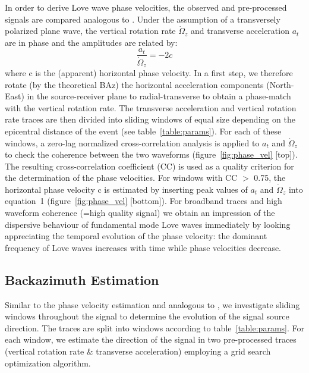 \documentclass[12pt,reqno,letter]{article}
\begin{document}
In order to derive Love wave phase velocities, the observed and pre-processed signals are compared analogous to \cite{Igel2005}. Under the assumption of a transversely polarized plane wave, the vertical rotation rate $\dot{\Omega}_z$ and transverse acceleration $a_t$ are in phase and the amplitudes are related by: 
\begin{equation}
	\frac{a_t}{\dot{\Omega}_z} = -2c
\end{equation}
where c is the (apparent) horizontal phase velocity. In a first step, we therefore rotate (by the theoretical BAz) the horizontal acceleration components (North-East) in the source-receiver plane to radial-transverse to obtain a phase-match with the vertical rotation rate. The transverse acceleration and vertical rotation rate traces are then divided into sliding windows of equal size depending on the epicentral distance of the event (see table~\ref{table:params}).
For each of these windows, a zero-lag normalized cross-correlation analysis is applied to $a_t$ and $\dot{\Omega}_z$ to check the coherence between the two waveforms (figure~\ref{fig:phase_vel} [top]). The resulting cross-correlation coefficient (CC) is used as a quality criterion for the determination of the phase velocities. For windows with CC $>$ 0.75, the horizontal phase velocity c is estimated by inserting peak values of $a_t$ and $\dot{\Omega}_z$ into equation~1 (figure~\ref{fig:phase_vel} [bottom]).
For broadband traces and high waveform coherence (=high quality signal) we  obtain an impression of the dispersive behaviour of fundamental mode Love waves immediately by looking appreciating the temporal evolution of the phase velocity:  the dominant frequency of Love waves increases with time while phase velocities decrease.

\subsection*{Backazimuth Estimation}
\label{subsec:be}
Similar to the phase velocity estimation and analogous to \cite{Igel2007}, we investigate sliding windows throughout the signal to determine the evolution of the signal source direction. The traces are split into windows according to table~\ref{table:params}.
For each window, we estimate the direction of the signal in  two pre-processed traces (vertical rotation rate \& transverse acceleration) employing a grid search optimization algorithm. 
%
\end{document}
